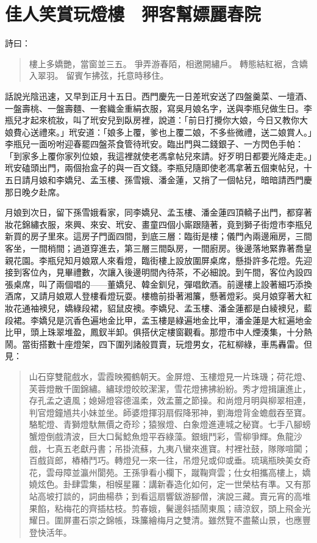 
\chapter{佳人笑賞玩燈樓　狎客幫嫖麗春院}

詩曰：
\begin{quote}
樓上多嬌艷，當窗並三五。
爭弄游春陌，相邀開繡戶。
轉態結紅裾，含嬌入翠羽。
留賓乍拂弦，托意時移住。
\end{quote}

話說光陰迅速，又早到正月十五日。西門慶先一日差玳安送了四盤羹菜、一壇酒、一盤壽桃、一盤壽麵、一套織金重絹衣服，寫吳月娘名字，送與李瓶兒做生日。李瓶兒才起來梳妝，叫了玳安兒到臥房裡，說道：「前日打攪你大娘，今日又教你大娘費心送禮來。」玳安道：「娘多上覆，爹也上覆二娘，不多些微禮，送二娘賞人。」李瓶兒一面吩咐迎春罷四盤茶食管待玳安。臨出門與二錢銀子、一方閃色手帕：「到家多上覆你家列位娘，我這裡就使老馮拿帖兒來請。好歹明日都要光降走走。」玳安磕頭出門，兩個抬盒子的與一百文錢。李瓶兒隨即使老馮拿著五個柬帖兒，十五日請月娘和李嬌兒、孟玉樓、孫雪娥、潘金蓮，又捎了一個帖兒，暗暗請西門慶那日晚夕赴席。

月娘到次日，留下孫雪娥看家，同李嬌兒、孟玉樓、潘金蓮四頂轎子出門，都穿著妝花錦繡衣服，來興、來安、玳安、畫童四個小廝跟隨著，竟到獅子街燈市李瓶兒新買的房子里來。這房子門面四間，到底三層：臨街是樓；儀門內兩邊廂房，三間客坐，一間梢間；過道穿進去，第三層三間臥房，一間廚房。後邊落地緊靠著喬皇親花園。李瓶兒知月娘眾人來看燈，臨街樓上設放圍屏桌席，懸掛許多花燈。先迎接到客位內，見畢禮數，次讓入後邊明間內待茶，不必細說。到午間，客位內設四張桌席，叫了兩個唱的——董嬌兒、韓金釧兒，彈唱飲酒。前邊樓上設著細巧添換酒席，又請月娘眾人登樓看燈玩耍。樓檐前掛著湘簾，懸著燈彩。吳月娘穿著大紅妝花通袖襖兒，嬌綠段裙，貂鼠皮襖。李嬌兒、孟玉樓、潘金蓮都是白綾襖兒，藍段裙。李嬌兒是沉香色遍地金比甲，孟玉樓是綠遍地金比甲，潘金蓮是大紅遍地金比甲，頭上珠翠堆盈，鳳釵半卸。俱搭伏定樓窗觀看。那燈市中人煙湊集，十分熱鬧。當街搭數十座燈架，四下圍列諸般買賣，玩燈男女，花紅柳綠，車馬轟雷。但見：
\begin{quote}
山石穿雙龍戲水，雲霞映獨鶴朝天。金屏燈、玉樓燈見一片珠璣；荷花燈、芙蓉燈散千圍錦繡。繡球燈皎皎潔潔，雪花燈拂拂紛紛。秀才燈揖讓進止，存孔孟之遺風；媳婦燈容德溫柔，效孟薑之節操。和尚燈月明與柳翠相連，判官燈鐘馗共小妹並坐。師婆燈揮羽扇假降邪神，劉海燈背金蟾戲吞至寶。駱駝燈、青獅燈馱無價之奇珍；猿猴燈、白象燈進連城之秘寶。七手八腳螃蟹燈倒戲清波，巨大口髯鯰魚燈平吞綠藻。銀蛾鬥彩，雪柳爭輝。魚龍沙戲，七真五老獻丹書；吊掛流蘇，九夷八蠻來進寶。村裡社鼓，隊隊喧闐；百戲貨郎，樁樁鬥巧。轉燈兒一來一往，吊燈兒或仰或垂。琉璃瓶映美女奇花，雲母障並瀛州閬苑。王孫爭看小欄下，蹴鞠齊雲；仕女相攜高樓上，嬌嬈炫色。卦肆雲集，相幙星羅：講新春造化如何，定一世榮枯有準。又有那站高坡打談的，詞曲楊恭；到看這扇響鈸游腳僧，演說三藏。賣元宵的高堆果餡，粘梅花的齊插枯枝。剪春娥，鬢邊斜插鬧東風；禱涼釵，頭上飛金光耀日。圍屏畫石崇之錦帳，珠簾繪梅月之雙清。雖然覽不盡鰲山景，也應豐登快活年。
\end{quote}

